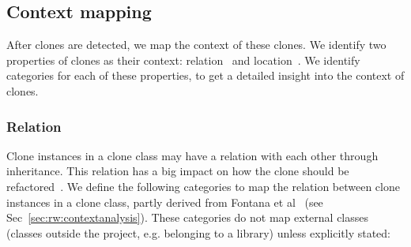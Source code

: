 \documentclass[sigconf,review,anonymous]{acmart}
\begin{document}
\subsection{Context mapping} \label{sec:context}
After clones are detected, we map the context of these clones. We identify two properties of clones as their context: relation~\cite{fontana2012duplicated} and location~\cite{tairas2011representing}. We identify categories for each of these properties, to get a detailed insight into the context of clones.

\subsubsection{Relation}\label{sec:relation}
Clone instances in a clone class may have a relation with each other through inheritance. This relation has a big impact on how the clone should be refactored~\cite{fontana2015duplicated}. We define the following categories to map the relation between clone instances in a clone class, partly derived from Fontana et al~\cite{fontana2015duplicated} (see Sec~\ref{sec:rw:contextanalysis}). These categories do not map external classes (classes outside the project, e.g. belonging to a library) unless explicitly stated:
\end{document}
